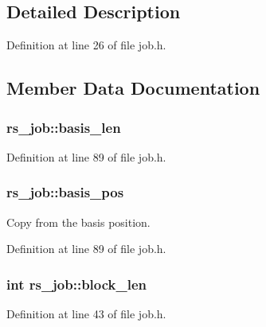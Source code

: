 \subsection{Detailed Description}


Definition at line 26 of file job.\+h.



\subsection{Member Data Documentation}
\hypertarget{structrs__job_a14f3a4e1db203002bcef60c1a01beffc}{}
\subsubsection[{basis\+\_\+len}]{ rs\+\_\+job\+::basis\+\_\+len}\label{structrs__job_a14f3a4e1db203002bcef60c1a01beffc}


Definition at line 89 of file job.\+h.

\hypertarget{structrs__job_a207f22dcb5ddd1624af1c9579e06254d}{}
\subsubsection[{basis\+\_\+pos}]{ rs\+\_\+job\+::basis\+\_\+pos}\label{structrs__job_a207f22dcb5ddd1624af1c9579e06254d}
Copy from the basis position. 

Definition at line 89 of file job.\+h.

\hypertarget{structrs__job_a72c83ee9e50622c59897e86886809e30}{}
\subsubsection[{block\+\_\+len}]{\setlength{\rightskip}{0pt plus 5cm}int rs\+\_\+job\+::block\+\_\+len}\label{structrs__job_a72c83ee9e50622c59897e86886809e30}


Definition at line 43 of file job.\+h.

\hypertarget{structrs__job_a80708900a8353f78945f9c55336ae156}{}
